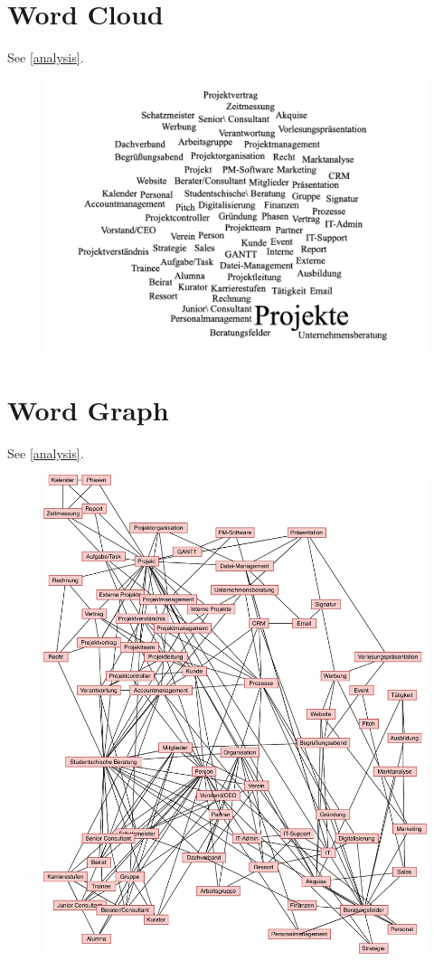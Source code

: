 \documentclass[a4paper, DIV=13, BCOR=0cm]{scrbook}
\begin{document}
\section{Word Cloud}
\label{word-cloud}
See \autoref{analysis}.
\begin{figure}[h]
	\centering
	\includegraphics[width=\textwidth]{Images/word-cloud.png}
\end{figure}
\clearpage

\section{Word Graph}
\label{word-graph}
See \autoref{analysis}.
\begin{figure}[h!]
	\centering
	\includegraphics[height=0.9\textheight, width=1\textwidth]{Diagrams/word-graph.pdf}
\end{figure}
\clearpage
\end{document}
